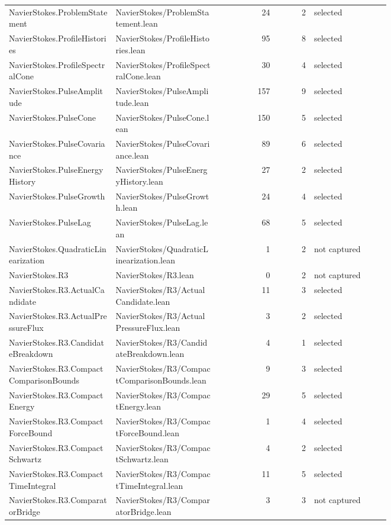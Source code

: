 \documentclass[10pt]{article}
\begin{document}
\begin{longtable}{p{0.28\linewidth}p{0.27\linewidth}r r p{0.20\linewidth}}
NavierStokes.ProblemStatement & NavierStokes/ProblemStatement.lean & 24 & 2 & selected\\
NavierStokes.ProfileHistories & NavierStokes/ProfileHistories.lean & 95 & 8 & selected\\
NavierStokes.ProfileSpectralCone & NavierStokes/ProfileSpectralCone.lean & 30 & 4 & selected\\
NavierStokes.PulseAmplitude & NavierStokes/PulseAmplitude.lean & 157 & 9 & selected\\
NavierStokes.PulseCone & NavierStokes/PulseCone.lean & 150 & 5 & selected\\
NavierStokes.PulseCovariance & NavierStokes/PulseCovariance.lean & 89 & 6 & selected\\
NavierStokes.PulseEnergyHistory & NavierStokes/PulseEnergyHistory.lean & 27 & 2 & selected\\
NavierStokes.PulseGrowth & NavierStokes/PulseGrowth.lean & 24 & 4 & selected\\
NavierStokes.PulseLag & NavierStokes/PulseLag.lean & 68 & 5 & selected\\
NavierStokes.QuadraticLinearization & NavierStokes/QuadraticLinearization.lean & 1 & 2 & not captured\\
NavierStokes.R3 & NavierStokes/R3.lean & 0 & 2 & not captured\\
NavierStokes.R3.ActualCandidate & NavierStokes/R3/ActualCandidate.lean & 11 & 3 & selected\\
NavierStokes.R3.ActualPressureFlux & NavierStokes/R3/ActualPressureFlux.lean & 3 & 2 & selected\\
NavierStokes.R3.CandidateBreakdown & NavierStokes/R3/CandidateBreakdown.lean & 4 & 1 & selected\\
NavierStokes.R3.CompactComparisonBounds & NavierStokes/R3/CompactComparisonBounds.lean & 9 & 3 & selected\\
NavierStokes.R3.CompactEnergy & NavierStokes/R3/CompactEnergy.lean & 29 & 5 & selected\\
NavierStokes.R3.CompactForceBound & NavierStokes/R3/CompactForceBound.lean & 1 & 4 & selected\\
NavierStokes.R3.CompactSchwartz & NavierStokes/R3/CompactSchwartz.lean & 4 & 2 & selected\\
NavierStokes.R3.CompactTimeIntegral & NavierStokes/R3/CompactTimeIntegral.lean & 11 & 5 & selected\\
NavierStokes.R3.ComparatorBridge & NavierStokes/R3/ComparatorBridge.lean & 3 & 3 & not captured\\

\end{longtable}
\end{document}
